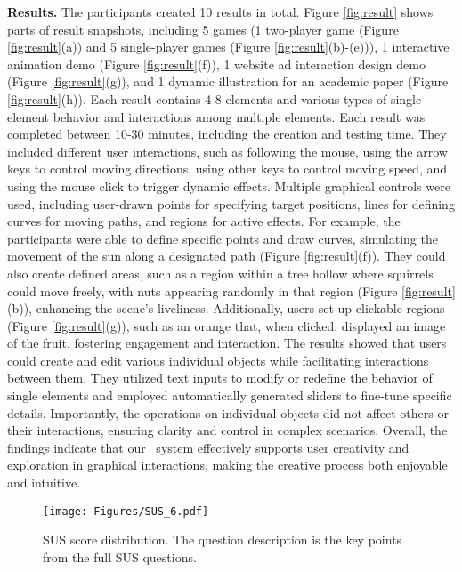 \textbf{Results.} The %
participants created 10 results in total. Figure \ref{fig:result} shows parts of result snapshots, including 5 games (1 two-player game (Figure \ref{fig:result}(a)) and 5 single-player games (Figure \ref{fig:result}(b)-(e))), 1 interactive animation demo (Figure \ref{fig:result}(f)), 
1 website ad interaction design demo (Figure \ref{fig:result}(g)), and 1 dynamic illustration for an academic paper (Figure \ref{fig:result}(h)). Each result contains 4-8 elements and various types of single element behavior and interactions among multiple elements. Each result was %
completed between 
10-30 minutes, including the creation and testing time. They included different user interactions, such as following the mouse, using the arrow keys to control moving directions, using other keys to control moving speed, and using the mouse click to trigger dynamic effects. Multiple graphical controls {were used}, %
including user-drawn points for specifying target positions, lines for defining curves for moving paths, and regions for active effects. {For example,} the participants were able to define specific points and draw curves, simulating the movement of the sun along a designated path (Figure \ref{fig:result}(f)). They could also create defined areas, such as a {region} %
within a tree hollow where squirrels could move freely, with nuts appearing randomly in that region (Figure \ref{fig:result}(b)), enhancing the scene's liveliness. Additionally, users set up clickable regions (Figure \ref{fig:result}(g)), such as an orange that, when clicked, displayed an image of the fruit, fostering engagement and interaction. The results showed that users could create and edit various individual objects while facilitating interactions between them. They utilized text inputs to modify or redefine the behavior of single elements and employed automatically generated sliders to fine-tune specific details. Importantly, the operations on individual objects did not affect others or their interactions, ensuring clarity and control in complex scenarios. Overall, the findings indicate that our \sysName~system effectively supports user creativity and exploration in graphical interactions, making the creative process both enjoyable and intuitive.



\begin{figure*}[t]
\texttt{[image: Figures/SUS\_6.pdf]}
  \caption{SUS score distribution. The question description is the key points from the full SUS questions.}
  \label{fig:sus}
\end{figure*}

